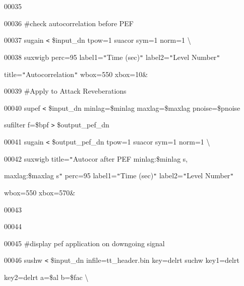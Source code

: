 \documentclass{article}
\begin{document}
\vspace{4pt}
00035 

\vspace{4pt}
00036 \#check autocorrelation before PEF

\vspace{4pt}
00037 sugain \texttt{<} \$input\_dn tpow=1 \textbar{} suacor sym=1 norm=1 \textbackslash{}

\vspace{4pt}
00038            \textbar{} suxwigb perc=95 label1=\texttt{"}Time (sec)\texttt{"} 
label2=\texttt{"}Level Number\texttt{"}  

\vspace{4pt}
\parindent=18pt
title=\texttt{"}Autocorrelation\texttt{"} wbox=550 xbox=10\&

\vspace{4pt}
\parindent=0pt
00039 \#Apply to Attack Reveberations

\vspace{4pt}
00040 supef \texttt{<} \$input\_dn minlag=\$minlag maxlag=\$maxlag pnoise=\$pnoise 
 \textbar{} 

\vspace{4pt}
sufilter f=\$bpf \texttt{>} \$output\_pef\_dn

\vspace{4pt}
00041 sugain \texttt{<} \$output\_pef\_dn tpow=1 \textbar{} suacor  sym=1 norm=1 
 \textbackslash{}

\vspace{4pt}
00042            \textbar{} suxwigb title=\texttt{"}Autocor after PEF minlag:\$minlag 
s, 

\vspace{4pt}
\parindent=18pt
maxlag:\$maxlag s\texttt{"} perc=95 label1=\texttt{"}Time (sec)\texttt{"} label2=\texttt{"}Level 
Number\texttt{"} 

\vspace{4pt}
wbox=550 xbox=570\&

\vspace{4pt}
00043 

\vspace{4pt}
00044 

\vspace{4pt}
00045 \#display pef application on downgoing signal

\vspace{4pt}
\parindent=0pt
00046 sushw \texttt{<} \$input\_dn infile=tt\_header.bin key=delrt \textbar{} suchw 
key1=delrt 

\vspace{4pt}
\parindent=18pt
key2=delrt a=\$al b=\$fac \textbackslash{}
\end{document}
